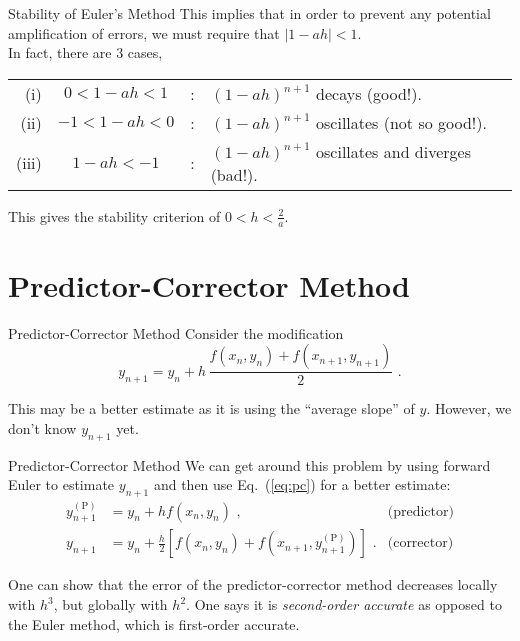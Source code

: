 \documentclass[11pt]{beamer}
\begin{document}
\begin{frame}[fragile]{Stability of Euler's Method}
This implies that in order to prevent any potential amplification of
errors, we must require that $|1-ah|<1$.\\
In fact, there are  3 cases,

\begin{tabular}{rccl}
(i)  &$0 < 1-ah < 1$  &:& $(1-ah)^{n+1}$ decays (good!).\\
(ii) &$-1 < 1-ah < 0$ &:& $(1-ah)^{n+1}$ oscillates (not so good!).\\
(iii)&$1-ah < -1$     &:& $(1-ah)^{n+1}$ oscillates and diverges (bad!).
\end{tabular}
\vspace{1cm}

This gives the stability criterion of $0< h < \frac{2}{a}$.
\end{frame}

\section{Predictor-Corrector Method}
\begin{frame}[fragile]{Predictor-Corrector Method}
Consider the modification
\begin{equation}
y_{n+1} = y_{n} + h\, \frac{f(x_n, y_n) + f(x_{n+1},y_{n+1})}{2}\,\,.
\label{eq:pc}
\end{equation}

This may be a better estimate as it is using the ``average slope''
of $y$. However, we don't know $y_{n+1}$ yet.
\end{frame}

\begin{frame}[fragile]{Predictor-Corrector Method}
We can get around this problem by using forward Euler to estimate
$y_{n+1}$ and then use Eq.~(\ref{eq:pc}) for a better estimate:
\begin{equation}
\begin{aligned}
y_{n+1}^{(\mathrm{P})} &= y_n + h f(x_n,y_n)\,\,, & \text{(predictor)}\\
y_{n+1} &= y_n + \frac{h}{2} \left[f(x_n,y_n) + f(x_{n+1}, y^{(\mathrm{P})}_{n+1}) \right]\,\,. & \text{(corrector)}
\end{aligned}
\end{equation}

One can show that the error of the predictor-corrector method
decreases locally with $h^3$, but globally with $h^2$.  One says it is
\emph{second-order accurate} as opposed to the Euler method, which is
first-order accurate. 
\end{frame}
\end{document}
